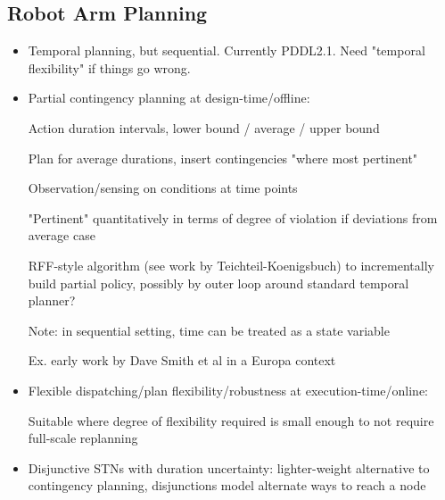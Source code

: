 

\subsection{Robot Arm Planning}

\begin{itemize}

\item Temporal planning, but sequential. Currently PDDL2.1. Need
  "temporal flexibility" if things go wrong.

\item Partial contingency planning at design-time/offline:

    Action duration intervals, lower bound / average / upper bound
    
    Plan for average durations, insert contingencies "where most
    pertinent"
    
    Observation/sensing on conditions at time points
    
    "Pertinent" quantitatively in terms of degree of violation if
    deviations from average case
    
    RFF-style algorithm (see work by Teichteil-Koenigsbuch) to
    incrementally build partial policy, possibly by outer loop around
    standard temporal planner?
    
    Note: in sequential setting, time can be treated as a state
    variable
    
    Ex. early work by Dave Smith et al in a Europa context

\item Flexible dispatching/plan flexibility/robustness at
  execution-time/online:

    Suitable where degree of flexibility required is small enough to
    not require full-scale replanning
    
\item Disjunctive STNs with duration uncertainty: lighter-weight
  alternative to contingency planning, disjunctions model alternate
  ways to reach a node
    
\end{itemize}























